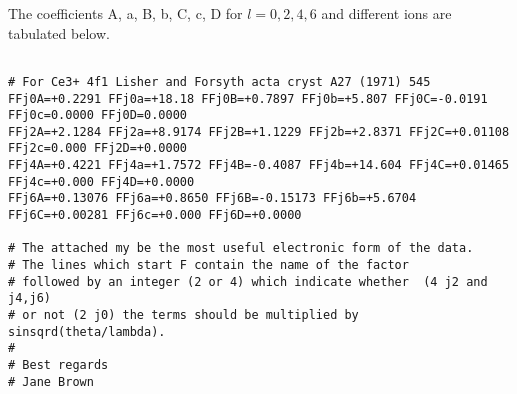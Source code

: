 The coefficients A, a, B, b, C, c, D for $l=0,2,4,6$ and different ions are tabulated below. 

{\footnotesize
\begin{verbatim}

# For Ce3+ 4f1 Lisher and Forsyth acta cryst A27 (1971) 545
FFj0A=+0.2291 FFj0a=+18.18 FFj0B=+0.7897 FFj0b=+5.807 FFj0C=-0.0191 FFj0c=0.0000 FFj0D=0.0000
FFj2A=+2.1284 FFj2a=+8.9174 FFj2B=+1.1229 FFj2b=+2.8371 FFj2C=+0.01108 FFj2c=0.000 FFj2D=+0.0000
FFj4A=+0.4221 FFj4a=+1.7572 FFj4B=-0.4087 FFj4b=+14.604 FFj4C=+0.01465 FFj4c=+0.000 FFj4D=+0.0000
FFj6A=+0.13076 FFj6a=+0.8650 FFj6B=-0.15173 FFj6b=+5.6704 FFj6C=+0.00281 FFj6c=+0.000 FFj6D=+0.0000

# The attached my be the most useful electronic form of the data.
# The lines which start F contain the name of the factor
# followed by an integer (2 or 4) which indicate whether  (4 j2 and j4,j6)
# or not (2 j0) the terms should be multiplied by sinsqrd(theta/lambda).
#
# Best regards
# Jane Brown


\end{verbatim}}
